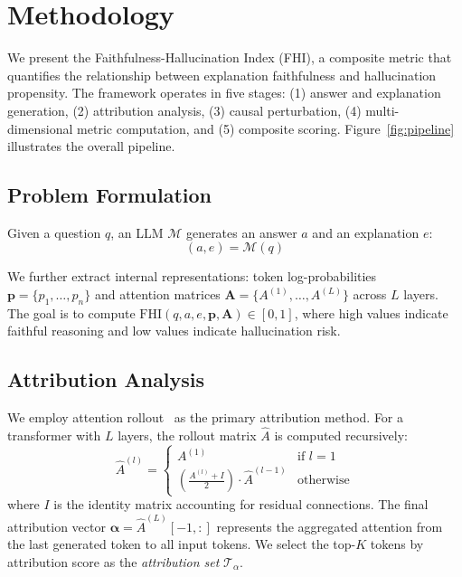 \section{Methodology}
\label{sec:methodology}

We present the Faithfulness-Hallucination Index (FHI), a composite metric that quantifies the relationship between explanation faithfulness and hallucination propensity. The framework operates in five stages: (1) answer and explanation generation, (2) attribution analysis, (3) causal perturbation, (4) multi-dimensional metric computation, and (5) composite scoring. Figure~\ref{fig:pipeline} illustrates the overall pipeline.

\subsection{Problem Formulation}

Given a question $q$, an LLM $\mathcal{M}$ generates an answer $a$ and an explanation $e$:
\begin{equation}
    (a, e) = \mathcal{M}(q)
\end{equation}

We further extract internal representations: token log-probabilities $\mathbf{p} = \{p_1, \ldots, p_n\}$ and attention matrices $\mathbf{A} = \{A^{(1)}, \ldots, A^{(L)}\}$ across $L$ layers. The goal is to compute $\text{FHI}(q, a, e, \mathbf{p}, \mathbf{A}) \in [0, 1]$, where high values indicate faithful reasoning and low values indicate hallucination risk.

\subsection{Attribution Analysis}

We employ attention rollout~\cite{abnar2020quantifying} as the primary attribution method. For a transformer with $L$ layers, the rollout matrix $\hat{A}$ is computed recursively:
\begin{equation}
    \hat{A}^{(l)} = \begin{cases}
        A^{(1)} & \text{if } l = 1 \\
        \left(\frac{A^{(l)} + I}{2}\right) \cdot \hat{A}^{(l-1)} & \text{otherwise}
    \end{cases}
\end{equation}
where $I$ is the identity matrix accounting for residual connections. The final attribution vector $\boldsymbol{\alpha} = \hat{A}^{(L)}[{-1}, :]$ represents the aggregated attention from the last generated token to all input tokens. We select the top-$K$ tokens by attribution score as the \textit{attribution set} $\mathcal{T}_\alpha$.

